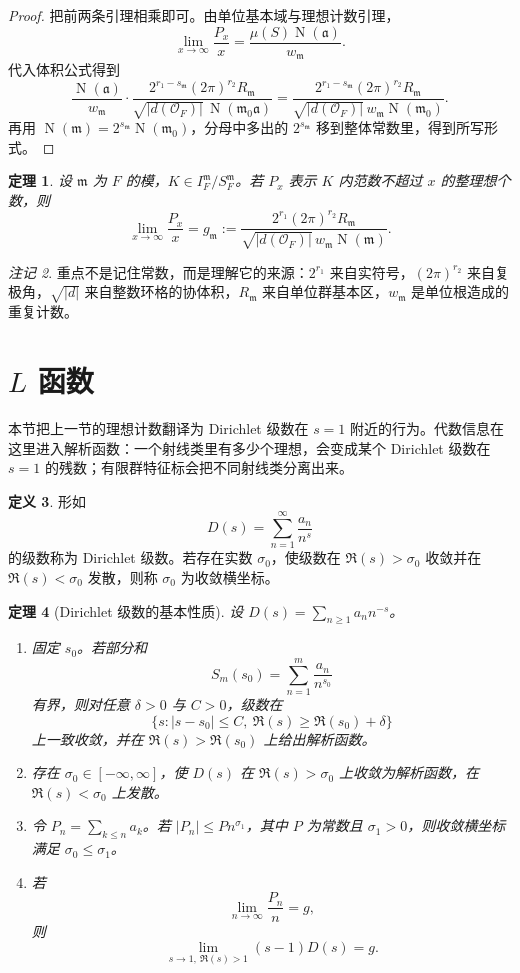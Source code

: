 \documentclass[11pt,a4paper,openany]{ctexbook}
\numberwithin{equation}{chapter}
\newcommand{\OF}{\mathcal{O}_F}
\newcommand{\Nm}{\operatorname{N}}
\theoremstyle{plain}
\newtheorem{theorem}{定理}[chapter]
\theoremstyle{definition}
\newtheorem{definition}[theorem]{定义}
\theoremstyle{remark}
\newtheorem{remark}[theorem]{注记}
\begin{document}
\begin{proof}
把前两条引理相乘即可。由单位基本域与理想计数引理，
\[
\lim_{x\to\infty}\frac{P_x}{x}
=\frac{\mu(S)\Nm(\mathfrak a)}{w_{\mathfrak m}}.
\]
代入体积公式得到
\[
\frac{\Nm(\mathfrak a)}{w_{\mathfrak m}}\cdot
\frac{2^{r_1-s_{\mathfrak m}}(2\pi)^{r_2}R_{\mathfrak m}}
{\sqrt{|d(\OF)|}\,\Nm(\mathfrak m_0\mathfrak a)}
=
\frac{2^{r_1-s_{\mathfrak m}}(2\pi)^{r_2}R_{\mathfrak m}}
{\sqrt{|d(\OF)|}\,w_{\mathfrak m}\Nm(\mathfrak m_0)}.
\]
再用 $\Nm(\mathfrak m)=2^{s_{\mathfrak m}}\Nm(\mathfrak m_0)$，分母中多出的
$2^{s_{\mathfrak m}}$ 移到整体常数里，得到所写形式。
\end{proof}

\begin{theorem}
设 $\mathfrak m$ 为 $F$ 的模，$K\in I_F^{\mathfrak m}/S_F^{\mathfrak m}$。若 $P_x$ 表示 $K$ 内范数不超过 $x$ 的整理想个数，则
\[
\lim_{x\to\infty}\frac{P_x}{x}
=
g_{\mathfrak m}
:=
\frac{2^{r_1}(2\pi)^{r_2}R_{\mathfrak m}}
{\sqrt{|d(\OF)|}\,w_{\mathfrak m}\Nm(\mathfrak m)}.
\]
\end{theorem}

\begin{remark}
重点不是记住常数，而是理解它的来源：$2^{r_1}$ 来自实符号，$(2\pi)^{r_2}$ 来自复极角，$\sqrt{|d|}$ 来自整数环格的协体积，$R_{\mathfrak m}$ 来自单位群基本区，$w_{\mathfrak m}$ 是单位根造成的重复计数。
\end{remark}

\section{\texorpdfstring{$L$}{L} 函数}

本节把上一节的理想计数翻译为 Dirichlet 级数在 $s=1$ 附近的行为。代数信息在这里进入解析函数：一个射线类里有多少个理想，会变成某个 Dirichlet 级数在 $s=1$ 的残数；有限群特征标会把不同射线类分离出来。

\begin{definition}
形如
\[
D(s)=\sum_{n=1}^\infty\frac{a_n}{n^s}
\]
的级数称为 Dirichlet 级数。若存在实数 $\sigma_0$，使级数在
$\Re(s)>\sigma_0$ 收敛并在 $\Re(s)<\sigma_0$ 发散，则称
$\sigma_0$ 为收敛横坐标。
\end{definition}

\begin{theorem}[Dirichlet 级数的基本性质]
设 $D(s)=\sum_{n\ge1}a_nn^{-s}$。
\begin{enumerate}[label=(\arabic*)]
\item 固定 $s_0$。若部分和
\[
S_m(s_0)=\sum_{n=1}^m\frac{a_n}{n^{s_0}}
\]
有界，则对任意 $\delta>0$ 与 $C>0$，级数在
\[
\{s: |s-s_0|\le C,\ \Re(s)\ge\Re(s_0)+\delta\}
\]
上一致收敛，并在 $\Re(s)>\Re(s_0)$ 上给出解析函数。
\item 存在 $\sigma_0\in[-\infty,\infty]$，使 $D(s)$ 在
$\Re(s)>\sigma_0$ 上收敛为解析函数，在 $\Re(s)<\sigma_0$ 上发散。
\item 令 $P_n=\sum_{k\le n}a_k$。若 $|P_n|\le Pn^{\sigma_1}$，其中
$P$ 为常数且 $\sigma_1>0$，则收敛横坐标满足 $\sigma_0\le\sigma_1$。
\item 若
\[
\lim_{n\to\infty}\frac{P_n}{n}=g,
\]
则
\[
\lim_{s\to1,\ \Re(s)>1}(s-1)D(s)=g.
\]
\end{enumerate}
\end{theorem}
\end{document}
